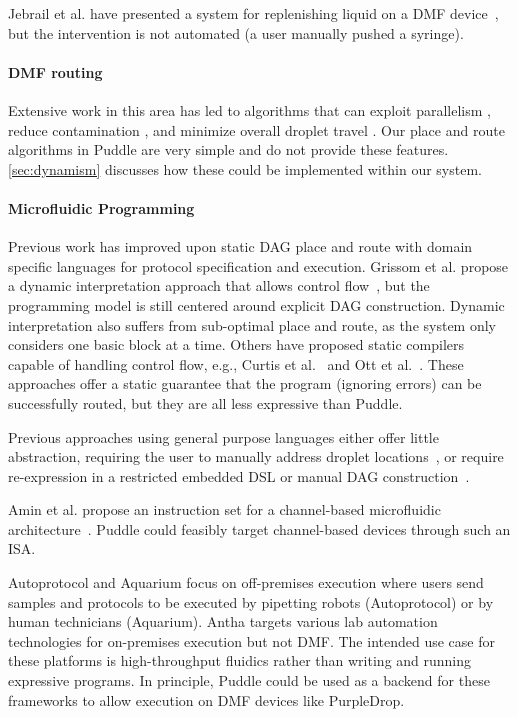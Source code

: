 \documentclass[sigconf, screen]{acmart}
\begin{document}
Jebrail et al. have presented a system for replenishing liquid on a DMF device~\cite{jebrail2015solvent}, but the intervention is not automated (a user manually pushed a syringe).

\paragraph{DMF routing}

Extensive work in this area has led to algorithms that can
exploit parallelism \cite{bohringer2006parallel, grissom2012scheduling},
reduce contamination \cite{yao2016contamination, zhao2012contamination, huang2010contamination},
and minimize overall droplet travel \cite{keszocze2015routing, roy2010routing}.
Our place and route algorithms in Puddle are very simple and do not provide these features.
\autoref{sec:dynamism} discusses how these could be implemented within our system.

\paragraph{Microfluidic Programming}
Previous work has improved upon static DAG place and route with domain specific languages for protocol specification and execution.
Grissom et al. propose a dynamic interpretation approach that allows control flow~\cite{grissom2014interpreting}, but the programming model is still centered around explicit DAG construction.
Dynamic interpretation also suffers from sub-optimal place and route, as the system only considers one basic block at a time.
Others have proposed static compilers capable of handling control flow, e.g., Curtis et al.~\cite{curtis2018compiler} and Ott et al.~\cite{ott2018bioscript}.
These approaches offer a static guarantee that the program (ignoring errors) can be successfully routed, but they are all less expressive than Puddle.

Previous approaches using general purpose languages either offer little abstraction, requiring the user to manually address droplet locations~\cite{opendrop, dropbot}, or require re-expression in a restricted embedded DSL or manual DAG construction~\cite{curtis2018compiler, biocoder}.

Amin et al. propose an instruction set for a channel-based microfluidic architecture~\cite{amin2007aquacore}.
Puddle could feasibly target channel-based devices through such an ISA.

Autoprotocol \cite{autoprotocol} and Aquarium \cite{aquarium} focus on off-premises execution where users send samples and protocols to be executed by pipetting robots (Autoprotocol) or by human technicians (Aquarium).
Antha \cite{antha} targets various lab automation technologies for on-premises execution but not DMF.
The intended use case for these platforms is high-throughput fluidics rather than writing and running expressive programs.
In principle, Puddle could be used as a backend for these frameworks to allow execution on DMF devices like PurpleDrop.
\end{document}
